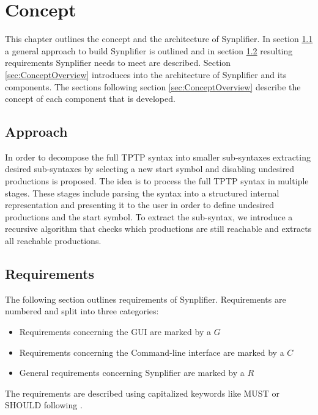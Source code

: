 
\chapter{Concept}\label{cha:Concept}
This chapter outlines the concept and the architecture of \ac{Synplifier}. In section \ref{sec:ConceptApproach} a general approach to build \ac{Synplifier} is outlined and in section \ref{sec:ConceptRequirements} resulting requirements \ac{Synplifier} needs to meet are described.
Section \ref{sec:ConceptOverview} introduces into the architecture of \ac{Synplifier} and its components.
The sections following section \ref{sec:ConceptOverview} describe the concept of each component that is developed.

\section{Approach}\label{sec:ConceptApproach}

In order to decompose the full \ac{TPTP} syntax into smaller sub-syntaxes extracting desired sub-syntaxes by selecting a new start symbol and disabling undesired productions is proposed.
The idea is to process the full \ac{TPTP} syntax in multiple stages.
These stages include parsing the syntax into a structured internal representation and presenting it to the user in order to define undesired productions and the start symbol. To extract the sub-syntax, we introduce a recursive algorithm that checks which productions are still reachable and extracts all reachable
productions.

\section{Requirements}\label{sec:ConceptRequirements}

The following section outlines requirements of \ac{Synplifier}. Requirements are numbered and split into three categories: 

\begin{itemize}
\item Requirements concerning the GUI are marked by a $G$
\item Requirements concerning the Command-line interface are marked by a $C$
\item General requirements concerning \ac{Synplifier} are marked by a $R$
\end{itemize}

The requirements are described using capitalized keywords like MUST or SHOULD following \cite{Bradner.1997}.

